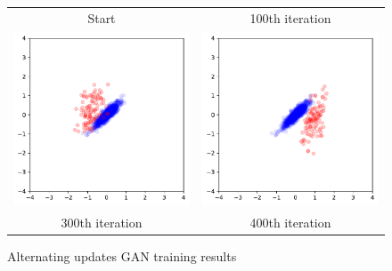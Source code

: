 \documentclass[12pt]{article}
\newcommand{\figw}{7cm}
\begin{document}
\begin{figure}
\begin{tabular}{cc}
Start & 100th iteration \\[6pt]
 \includegraphics[width=\figw]{hw2/codes/gan/plots/simultaneous/2.pdf} &   \includegraphics[width=\figw]{hw2/codes/gan/plots/simultaneous/3.pdf} \\
300th iteration & 400th iteration \\[6pt]
\end{tabular}
\caption{Alternating updates GAN training results} \label{fig:alternating}
\end{figure}
\end{document}
